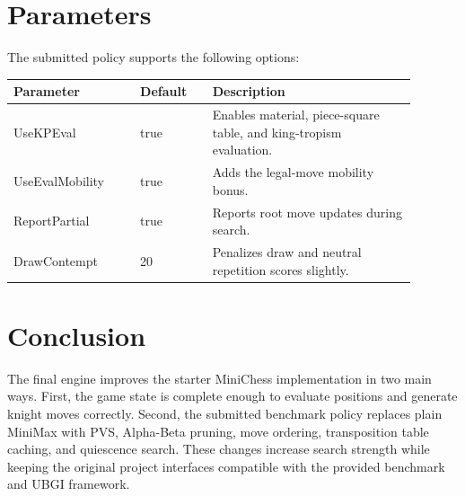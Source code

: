 \documentclass[11pt,a4paper]{article}
\begin{document}
\section{Parameters}

The submitted policy supports the following options:

\begin{center}
\begin{tabular}{>{\ttfamily}p{0.28\linewidth}p{0.16\linewidth}p{0.45\linewidth}}
\toprule
Parameter & Default & Description \\
\midrule
UseKPEval & true & Enables material, piece-square table, and king-tropism evaluation. \\
UseEvalMobility & true & Adds the legal-move mobility bonus. \\
ReportPartial & true & Reports root move updates during search. \\
DrawContempt & 20 & Penalizes draw and neutral repetition scores slightly. \\
\bottomrule
\end{tabular}
\end{center}

\section{Conclusion}

The final engine improves the starter MiniChess implementation in two main
ways. First, the game state is complete enough to evaluate positions and
generate knight moves correctly. Second, the submitted benchmark policy replaces
plain MiniMax with PVS, Alpha-Beta pruning, move ordering, transposition table
caching, and quiescence search. These changes increase search strength while
keeping the original project interfaces compatible with the provided benchmark
and UBGI framework.
\end{document}

